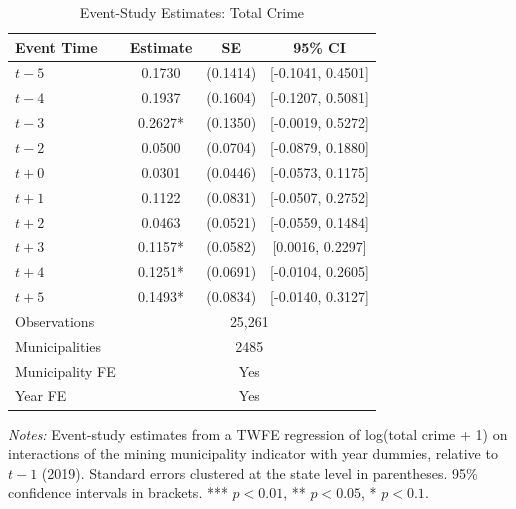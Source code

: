 \begin{table}[H]
\centering
\caption{Event-Study Estimates: Total Crime}
\label{tab:event_study}
\begin{threeparttable}
\begin{tabular}{l c c c}
\toprule
Event Time & Estimate & SE & 95\% CI \\
\midrule
$t-5$ & 0.1730 & (0.1414) & [-0.1041, 0.4501] \\
$t-4$ & 0.1937 & (0.1604) & [-0.1207, 0.5081] \\
$t-3$ & 0.2627* & (0.1350) & [-0.0019, 0.5272] \\
$t-2$ & 0.0500 & (0.0704) & [-0.0879, 0.1880] \\
$t+0$ & 0.0301 & (0.0446) & [-0.0573, 0.1175] \\
$t+1$ & 0.1122 & (0.0831) & [-0.0507, 0.2752] \\
$t+2$ & 0.0463 & (0.0521) & [-0.0559, 0.1484] \\
$t+3$ & 0.1157* & (0.0582) & [0.0016, 0.2297] \\
$t+4$ & 0.1251* & (0.0691) & [-0.0104, 0.2605] \\
$t+5$ & 0.1493* & (0.0834) & [-0.0140, 0.3127] \\
\midrule
Observations & \multicolumn{3}{c}{25,261} \\
Municipalities & \multicolumn{3}{c}{2485} \\
Municipality FE & \multicolumn{3}{c}{Yes} \\
Year FE & \multicolumn{3}{c}{Yes} \\
\bottomrule
\end{tabular}
\begin{tablenotes}[flushleft]\footnotesize
\item \textit{Notes:} Event-study estimates from a TWFE regression of log(total crime + 1) on interactions of the mining municipality indicator with year dummies, relative to $t-1$ (2019). Standard errors clustered at the state level in parentheses. 95\% confidence intervals in brackets. *** $p<0.01$, ** $p<0.05$, * $p<0.1$.
\end{tablenotes}
\end{threeparttable}
\end{table}

